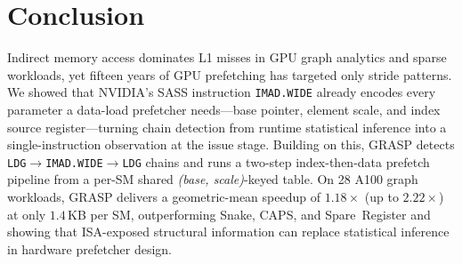 \documentclass[sigconf, screen, review]{acmart}
\begin{document}
\section{Conclusion}
\label{sec:conclusion}

Indirect memory access dominates L1 misses in GPU graph
analytics and sparse workloads, yet fifteen years of GPU
prefetching has targeted only stride patterns. We showed that
NVIDIA's SASS instruction \texttt{IMAD.WIDE} already encodes
every parameter a data-load prefetcher needs---base pointer,
element scale, and index source register---turning chain
detection from runtime statistical inference into a
single-instruction observation at the issue stage. Building on
this, GRASP detects
\texttt{LDG}$\to$\texttt{IMAD.WIDE}$\to$\texttt{LDG} chains and
runs a two-step index-then-data prefetch pipeline from a per-SM
shared \emph{(base, scale)}-keyed table. On 28 A100 graph
workloads, GRASP delivers a geometric-mean speedup of
$1.18\times$ (up to $2.22\times$) at only $1.4$\,KB per SM,
outperforming Snake, CAPS, and Spare~Register and showing that
ISA-exposed structural information can replace statistical
inference in hardware prefetcher design.







\end{document}
